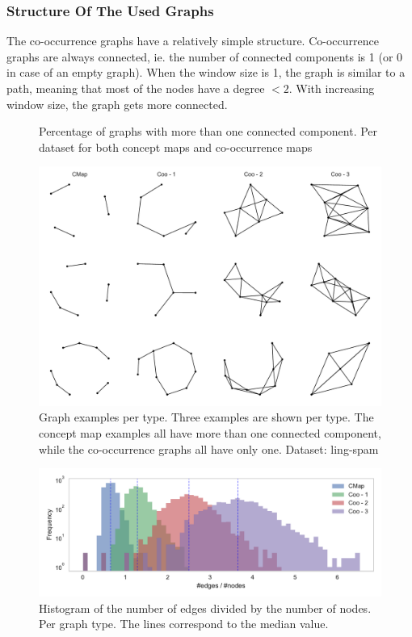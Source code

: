 
\subsubsection{Structure Of The Used Graphs}
The co-occurrence graphs have a relatively simple structure.
Co-occurrence graphs are always connected, ie. the number of connected components is 1 (or 0 in case of an empty graph).
When the window size is 1, the graph is similar to a path, meaning that most of the nodes have a degree $< 2$. With increasing window size, the graph gets more connected.


\begin{figure}[ht]
\centering
\missingfigure[figcolor=white]{}
\caption{Percentage of graphs with more than one connected component. Per dataset for both concept maps and co-occurrence maps}
\end{figure}

\begin{figure}[ht]
\centering
\includegraphics[width=0.6\linewidth]{assets/figures/graph-examples.pdf}
\caption{Graph examples per type. Three examples are shown per type. The concept map examples all have more than one connected component, while the co-occurrence graphs all have only one. Dataset: ling-spam}
\end{figure}

\begin{figure}[ht]
\centering
\includegraphics[width=0.7\linewidth]{assets/figures/hist-edgesnodes.pdf}
\caption{Histogram of the number of edges divided by the number of nodes. Per graph type. The lines correspond to the median value.}
\label{fig:histogram-edges-div-nodes-per-type}
\end{figure}

